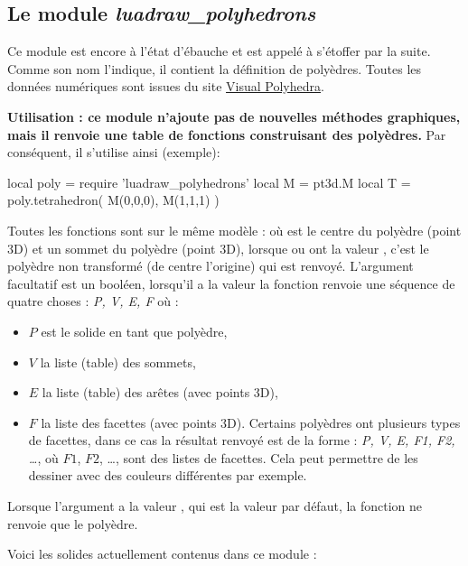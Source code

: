 \subsection{Le module \emph{luadraw\_polyhedrons}}

Ce module est encore à l'état d'ébauche et est appelé à s'étoffer par la suite. Comme son nom l'indique, il contient la définition de polyèdres. Toutes les données numériques sont issues du site \href{https://dmccooey.com/polyhedra/}{Visual Polyhedra}.

\textbf{Utilisation : ce module n'ajoute pas de nouvelles méthodes graphiques, mais il renvoie une table de fonctions construisant des polyèdres.} Par conséquent, il s'utilise ainsi (exemple):
\begin{Luacode}
local poly = require 'luadraw_polyhedrons'
local M = pt3d.M
local T = poly.tetrahedron( M(0,0,0), M(1,1,1) )
\end{Luacode}

Toutes les fonctions sont sur le même modèle :  où  est le centre du polyèdre (point 3D) et  un sommet du polyèdre (point 3D), lorsque  ou  ont la valeur \nil, c'est le polyèdre non transformé (de centre l'origine) qui est renvoyé. L'argument facultatif  est un booléen, lorsqu'il a la valeur \true la fonction renvoie une séquence de quatre choses : \emph{P, V, E, F} où :
    \begin{itemize}
        \item $P$ est le solide en tant que polyèdre,
        \item $V$ la liste (table) des sommets,
        \item $E$ la liste (table) des arêtes (avec points 3D),
        \item $F$ la liste des facettes (avec points 3D). Certains polyèdres ont plusieurs types de facettes, dans ce cas la résultat renvoyé est de la forme : \emph{P, V, E, F1, F2, \ldots}, où $F1$, $F2$, \ldots, sont des listes de facettes. Cela peut permettre de les dessiner avec des couleurs différentes par exemple.
        \end{itemize}
Lorsque l'argument  a la valeur \false, qui est la valeur par défaut, la fonction ne renvoie que le polyèdre.

Voici les solides actuellement contenus dans ce module :

